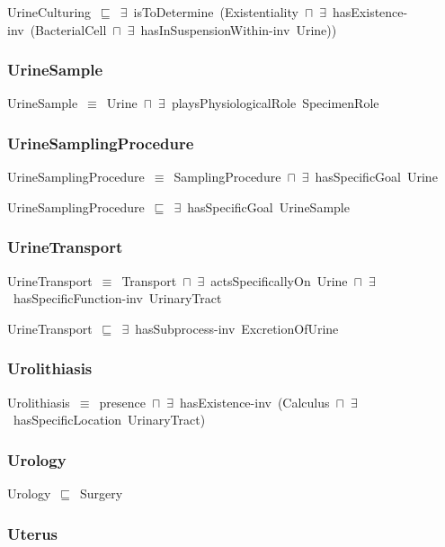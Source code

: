 \documentclass{article}
\begin{document}
UrineCulturing~\ensuremath{\sqsubseteq}~\ensuremath{\exists}~isToDetermine~(Existentiality~\ensuremath{\sqcap}~\ensuremath{\exists}~hasExistence-inv~(BacterialCell~\ensuremath{\sqcap}~\ensuremath{\exists}~hasInSuspensionWithin-inv~Urine))~

\subsubsection*{UrineSample}

UrineSample~\ensuremath{\equiv}~Urine~\ensuremath{\sqcap}~\ensuremath{\exists}~playsPhysiologicalRole~SpecimenRole

\subsubsection*{UrineSamplingProcedure}

UrineSamplingProcedure~\ensuremath{\equiv}~SamplingProcedure~\ensuremath{\sqcap}~\ensuremath{\exists}~hasSpecificGoal~Urine

UrineSamplingProcedure~\ensuremath{\sqsubseteq}~\ensuremath{\exists}~hasSpecificGoal~UrineSample~

\subsubsection*{UrineTransport}

UrineTransport~\ensuremath{\equiv}~Transport~\ensuremath{\sqcap}~\ensuremath{\exists}~actsSpecificallyOn~Urine~\ensuremath{\sqcap}~\ensuremath{\exists}~hasSpecificFunction-inv~UrinaryTract

UrineTransport~\ensuremath{\sqsubseteq}~\ensuremath{\exists}~hasSubprocess-inv~ExcretionOfUrine~

\subsubsection*{Urolithiasis}

Urolithiasis~\ensuremath{\equiv}~presence~\ensuremath{\sqcap}~\ensuremath{\exists}~hasExistence-inv~(Calculus~\ensuremath{\sqcap}~\ensuremath{\exists}~hasSpecificLocation~UrinaryTract)

\subsubsection*{Urology}

Urology~\ensuremath{\sqsubseteq}~Surgery~

\subsubsection*{Uterus}
\end{document}
